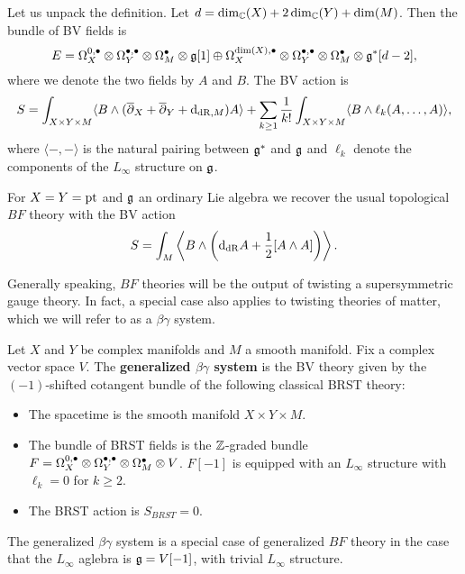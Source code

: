 \documentclass[10pt, oneside]{article}
\begin{document}
Let us unpack the definition. Let $d = \dim_\mathbb C(X) + 2\dim_\mathbb C(Y) + \dim(M)$. Then the bundle of BV fields is
\[E = \Omega^{0,\bullet}_X \otimes \Omega^{\bullet,\bullet}_Y \otimes \Omega^\bullet_M \otimes \mathfrak g[1]\oplus \Omega^{\dim(X),\bullet}_X \otimes \Omega^{\bullet,\bullet}_Y \otimes \Omega^\bullet_M\otimes \mathfrak g^*[d-2],\]
where we denote the two fields by $A$ and $B$. The BV action is
\[S = \int_{X\times Y\times M} \langle B\wedge (\overline{\partial}_X + \overline{\partial}_Y + {\rm d}_{\mathrm{dR}, M}) A\rangle + \sum_{k\geq 1}\frac{1}{k!} \int_{X\times Y\times M} \langle B\wedge \ell_k(A, \dots, A)\rangle,\]
where $\langle -, -\rangle$ is the natural pairing between $\mathfrak g^*$ and $\mathfrak g$ and $\ell_k$ denote the components of the $L_\infty$ structure on $\mathfrak g$.

\begin{example}
For $X=Y=\operatorname{pt}$ and $\mathfrak g$ an ordinary Lie algebra we recover the usual topological $BF$ theory with the BV action
\[S = \int_M \left\langle B\wedge \left({\rm d}_{\mathrm{dR}} A+ \frac{1}{2}[A\wedge A]\right)\right\rangle.\]
\end{example}

Generally speaking, $BF$ theories will be the output of twisting a supersymmetric gauge theory. 
In fact, a special case also applies to twisting theories of matter, which we will refer to as a $\beta\gamma$ system. 

\begin{definition}
Let $X$ and $Y$ be complex manifolds and $M$ a smooth manifold. Fix a complex vector space $V$. The {\bf generalized $\beta\gamma$ system} is the BV theory given by the $(-1)$-shifted cotangent bundle of the following classical BRST theory:
\begin{itemize}
\item The spacetime is the smooth manifold $X\times Y\times M$.

\item The bundle of BRST fields is the $\mathbb Z$-graded bundle $F = \Omega^{0,\bullet}_X \otimes \Omega^{\bullet,\bullet}_Y \otimes \Omega^\bullet_M \otimes V$. $F[-1]$ is equipped with an $L_\infty$ structure with $\ell_{k} = 0$ for $k \geq 2$. 

\item The BRST action is $S_{BRST} = 0$.
\end{itemize}
\end{definition}

The generalized $\beta\gamma$ system is a special case of generalized $BF$ theory in the case that the $L_\infty$ aglebra is $\mathfrak g = V[-1]$, with trivial $L_\infty$ structure. 
\end{document}
